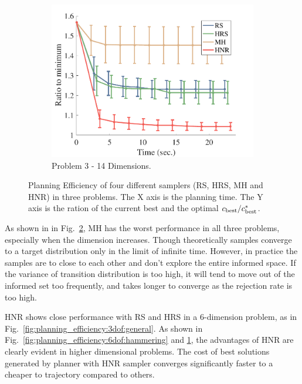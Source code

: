 \documentclass[letterpaper, 10 pt, conference]{ieeeconf}  %
\begin{document}
\begin{figure}[t!]
\begin{subfigure}[b]{0.325\textwidth}
	\includegraphics[width=\linewidth]{fig/planning_efficiency/herb_batting_efficiency}
	\caption{\captionstyle Problem 3 - 14 Dimensions.}
	\label{fig:planning_efficiency:herb:batting}
    \end{subfigure}
	\caption{\captionstyle Planning Efficiency of four different samplers (RS, HRS, MH and HNR) in three problems. 
	The X axis is the planning time. 
	The Y axis is the ration of the current best and the optimal $ c_{\rm best} / c^*_{\rm best} $.}
	\label{fig:planning_efficiency}
\end{figure} 


As shown in in Fig.~\ref{fig:planning_efficiency}, MH has the worst performance in all three problems, especially when the dimension increases.
Though theoretically samples converge to a target distribution only in the limit of infinite time. However, in practice the samples are to close to each other and don't explore the entire informed space.
If the variance of transition distribution is too high, it will tend to move out of the informed set too frequently, and takes longer to converge as the rejection rate is too high.

HNR shows close performance with RS and HRS in a 6-dimension problem, as in Fig.~\ref{fig:planning_efficiency:3dof:general}. 
As shown in Fig.~\ref{fig:planning_efficiency:6dof:hammering} and \ref{fig:planning_efficiency:herb:batting}, the advantages of HNR are clearly evident in higher dimensional problems. The cost of best solutions generated by planner with HNR sampler converges significantly faster to a cheaper to trajectory compared to others.
\end{document}
